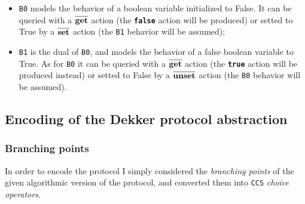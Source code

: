 \documentclass[10pt,a4paper]{article}
\newcommand{\CCS}{{\tt CCS}}
\newcommand{\Agent}[1]{{\tt {#1}}}
\newcommand{\Action}[1]{{\tt \bf {#1}}}
\newcommand{\CoAction}[1]{$\overline{\mbox{\Action{#1}}}$}
\begin{document}
        \begin{itemize}

        \item   \Agent{B0} models the behavior of a boolean variable
                initialized to False. It can be queried with a
                \CoAction{get} action (the \Action{false} action will be
                produced) or setted to True by a \CoAction{set} action
                (the \Agent{B1} behavior will be assumed);

        \item   \Agent{B1} is the dual of \Agent{B0}, and models the
                behavior of a false boolean variable 
                to True. As for \Agent{B0} it can be queried with a
                \CoAction{get} action (the \Action{true} action will be
                produced instead) or setted to False by a \CoAction{unset}
                action (the \Agent{B0} behavior will be assumed).

        \end{itemize}

    \subsection{Encoding of the Dekker protocol abstraction}

        \subsubsection{Branching points}
        \label{subsub:BranchingPoints}

            In order to encode the protocol I simply considered the
            \emph{branching points} of the given algorithmic version of
            the protocol, and converted them into \CCS{} \emph{choice
            operators}.
\end{document}
